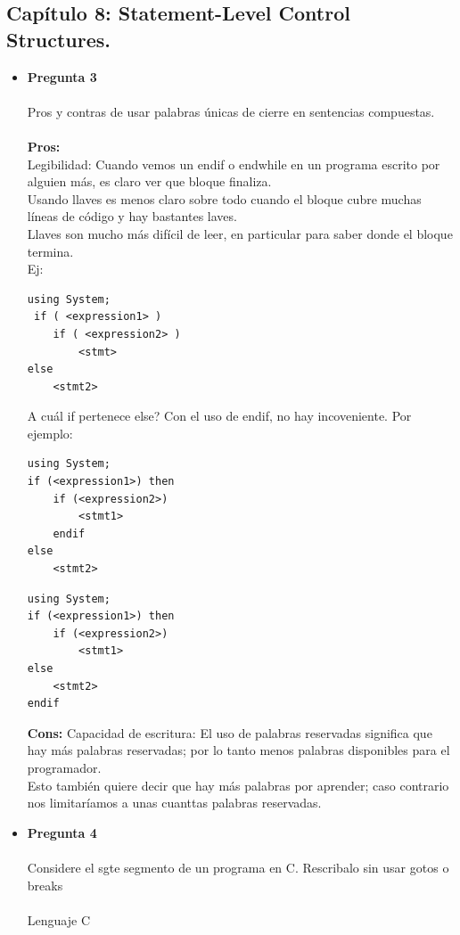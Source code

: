 \documentclass[12pt,oneside]{article}
\begin{document}
\subsection{Capítulo 8: Statement-Level Control Structures.}
\begin{itemize}
\item {\bf Pregunta 3} \\\\
Pros y contras de usar palabras únicas de cierre en sentencias compuestas. \\\\
{\bf Pros:}\\
Legibilidad: Cuando vemos un endif o endwhile en un programa escrito por alguien más, es claro ver que bloque finaliza.\\
Usando llaves {} es menos claro sobre todo cuando el bloque cubre muchas líneas de código y hay bastantes laves.\\
Llaves son mucho más difícil de leer, en particular para saber donde el bloque termina.\\
Ej:
\begin{lstlisting}[frame=single]  % Start your code-block
using System;
 if ( <expression1> )
	if ( <expression2> )
		<stmt>
else
	<stmt2>
\end{lstlisting}
A cuál if pertenece else? Con el uso de endif, no hay incoveniente. Por ejemplo:\\
\begin{lstlisting}[frame=single]  % Start your code-block
using System;
if (<expression1>) then 			
	if (<expression2>) 							
		<stmt1> 								
	endif 								
else 										
	<stmt2>							
\end{lstlisting}
\begin{lstlisting}[frame=single]  % Start your code-block
using System;
if (<expression1>) then
	if (<expression2>)
		<stmt1> 								
else
	<stmt2>
endif
\end{lstlisting}

{\bf Cons:} 
Capacidad de escritura: El uso de palabras reservadas significa que hay más palabras reservadas; por lo tanto menos palabras disponibles para el programador.\\
Esto también quiere decir que hay más palabras por aprender; caso contrario nos limitaríamos a unas cuanttas palabras reservadas.\\

\item {\bf Pregunta 4} \\\\
Considere el sgte segmento de un programa en C. Rescribalo sin usar gotos o breaks\\\\
Lenguaje C\\
\end{itemize}
\end{document}

